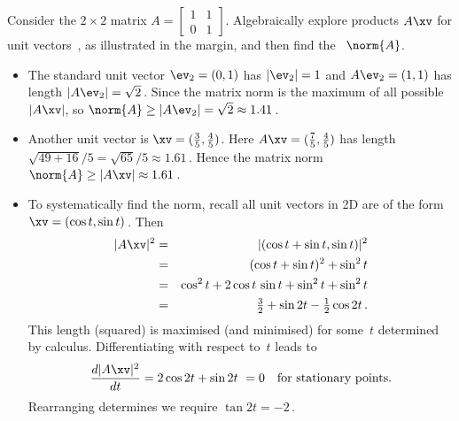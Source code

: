 \begin{example} \label{eg:}
Consider the \(2\times2\) matrix \(A=\begin{bmatrix} 1&1\\0&1 \end{bmatrix}\).
Algebraically explore products \(A\xv\) for unit vectors~\xv, as illustrated in the margin, 
and then find the ~\(\norm{A}\).
\begin{itemize}
\item The standard unit vector \(\ev_2=(0,1)\) has \(|\ev_2|=1\) and \(A\ev_2=(1,1)\) has length \(|A\ev_2|=\sqrt2\)\,.
Since the matrix norm is the maximum of all possible~\(|A\xv|\), so \(\norm{A}\geq|A\ev_2|=\sqrt2\approx 1.41\)\,.
\item Another unit vector is \(\xv=(\tfrac35,\tfrac45)\).
Here \(A\xv=(\tfrac75,\tfrac45)\) has length \(\sqrt{49+16}/5=\sqrt{65}/5\approx1.61\)\,.
Hence the matrix norm \(\norm{A}\geq|A\xv|\approx 1.61\)\,.
\item To systematically find the norm, recall all unit vectors in 2D are of the form \(\xv=(\cos t,\sin t)\)\,.
Then
\begin{eqnarray*}
|A\xv|^2&=&|(\cos t+\sin t,\sin t)|^2
\\&=&(\cos t+\sin t)^2+\sin^2 t
\\&=&\cos^2 t+2\cos t\,\sin t+\sin^2t+\sin^2 t
\\&=&\tfrac32+\sin 2t-\tfrac12\cos 2t\,.
\end{eqnarray*}
This length (squared) is maximised (and minimised) for some~\(t\) determined by calculus.
Differentiating with respect to~\(t\)  leads to
\begin{equation*}
\frac{d|A\xv|^2}{dt}=2\cos2t+\sin 2t \ =0\quad\text{for stationary points.}
\end{equation*}
Rearranging determines we require \(\tan 2t=-2\)\,.

\end{itemize}
\end{example}
